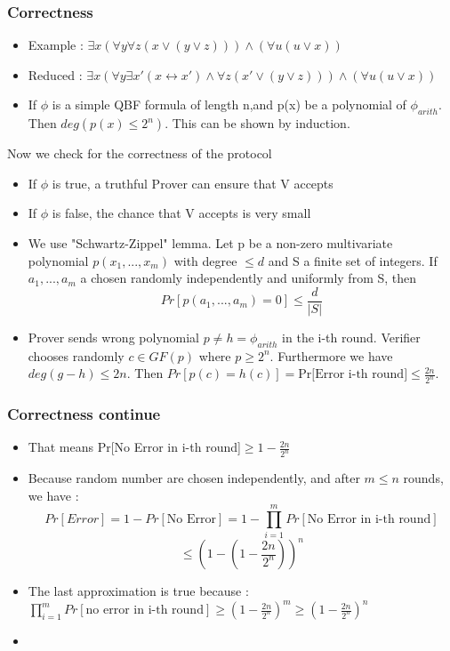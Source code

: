 \documentclass[hyperref={pdfpagelabels=false},t,10pt]{beamer}
\begin{document}
\begin{frame}
  \frametitle{Correctness}
  \begin{itemize}
    \item Example : $\exists x (\forall y \forall z (x \lor (y \lor z))) \land (\forall u (u \lor x))$
    \item Reduced : $\exists x (\forall y \exists x'  (x \leftrightarrow x') \land \forall z(x' \lor (y \lor z))) \land (\forall u (u \lor x))$
    \item If $\phi$ is a simple QBF formula of length n,and p(x) be a polynomial of $\phi_{arith}$. Then $deg(p(x) \leq 2^n)$. This can be shown by induction. \pause
  \end{itemize}
  Now we check for the correctness of the protocol

  \begin{itemize}
    \item If $\phi$ is true, a truthful Prover can ensure that V accepts \pause
    \item If $\phi$ is false, the chance that V accepts is very small \pause
    \item We use "Schwartz-Zippel" lemma. Let p be a non-zero multivariate polynomial $p(x_1,...,x_m)$ with degree $\leq d$ and S a finite set of integers.
    If $a_1,..., a_m$ a chosen randomly independently and uniformly from S, then $$Pr[p(a_1,...,a_m)= 0] \leq \frac{d}{|S|}$$ \pause
    \item Prover sends wrong polynomial $p \neq h =\phi_{arith}$ in the i-th round. Verifier chooses randomly $c\in GF(p)$ where $p\geq 2^n$. Furthermore we have $deg(g-h) \leq 2n$.
    Then $Pr[p(c) = h(c)] = \mbox{Pr[Error i-th round]} \leq \frac{2n}{2^n}$.
  \end{itemize}
\end{frame}

\begin{frame}
  \frametitle{Correctness continue}
  \begin{itemize}
    \item That means Pr[No Error in i-th round]$\geq 1- \frac{2n}{2^n}$
    \item Because random number are chosen independently, and after $m \leq n$ rounds, we have : 
    $$Pr[Error] = 1 - Pr[\mbox{No Error}] = 1- \prod_{i=1}^{m} Pr[\mbox{No Error in i-th round}]$$
    $$ \leq (1-(1-\frac{2n}{2^n}))^n$$ \newline
    \item  The last approximation is true because : $\prod_{i=1}^{m} Pr[\mbox{no error in i-th round}] \geq (1-\frac{2n}{2^n})^m \geq (1- \frac{2n}{2^n})^n$
    \item 
  \end{itemize}
\end{frame}
\end{document}
